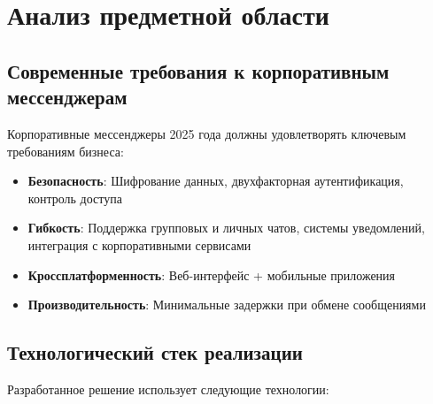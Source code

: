 \section{Анализ предметной области}
\subsection{Современные требования к корпоративным мессенджерам}

Корпоративные мессенджеры 2025 года должны удовлетворять ключевым требованиям бизнеса:
\begin{itemize}
	\item \textbf{Безопасность}: Шифрование данных, двухфакторная аутентификация, контроль доступа
	\item \textbf{Гибкость}: Поддержка групповых и личных чатов, системы уведомлений, интеграция с корпоративными сервисами
	\item \textbf{Кроссплатформенность}: Веб-интерфейс + мобильные приложения
	\item \textbf{Производительность}: Минимальные задержки при обмене сообщениями
\end{itemize}

\subsection{Технологический стек реализации}
Разработанное решение использует следующие технологии:

